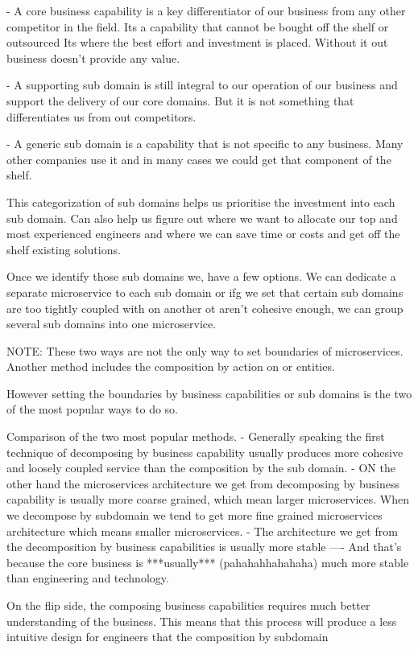 \documentclass[a4paper, 11pt]{book}
\begin{document}
    - A core business capability is a key differentiator of our business from any other competitor in the field.
    Its a capability that cannot be bought off the shelf or outsourced
    Its where the best effort and investment is placed.
    Without it out business doesn't provide any value.

    - A supporting sub domain is still integral to our operation of our business and support the delivery of our core domains.
    But it is not something that differentiates us from out competitors.

    - A generic sub domain is a capability that is not specific to any business.
    Many other companies use it and in many cases we could get that component of the shelf.

    This categorization of sub domains helps us prioritise the investment into each sub domain.
    Can also help us figure out where we want to allocate our top and most experienced engineers and where we can save time or costs and get off the shelf existing solutions.

    Once we identify those sub domains we, have a few options.
    We can dedicate a separate microservice to each sub domain or ifg we set that certain sub domains are too tightly coupled with on another ot aren't cohesive enough, we can group several sub domains into one microservice.

    NOTE: These two ways are not the only way to set boundaries of microservices.
    Another method includes the composition by action on or entities.

    However setting the boundaries by business capabilities or sub domains is the two of the most popular ways to do so.

    Comparison of the two most popular methods.
    - Generally speaking the first technique of decomposing by business capability usually produces more cohesive and loosely coupled service than the composition by the sub domain.
    - ON the other hand the microservices architecture we get from decomposing by business capability is usually more coarse grained, which mean larger microservices.
    When we decompose by subdomain we tend to get more fine grained microservices architecture which means smaller microservices.
    - The architecture we get from the decomposition by business capabilities is usually more stable
    ---- And that's because the core business is ***usually*** (pahahahhahahaha) much more stable than engineering and technology.

    On the flip side, the composing business capabilities requires much better understanding of the business.
    This means that this process will produce a less intuitive design for engineers that the composition by subdomain
\end{document}
